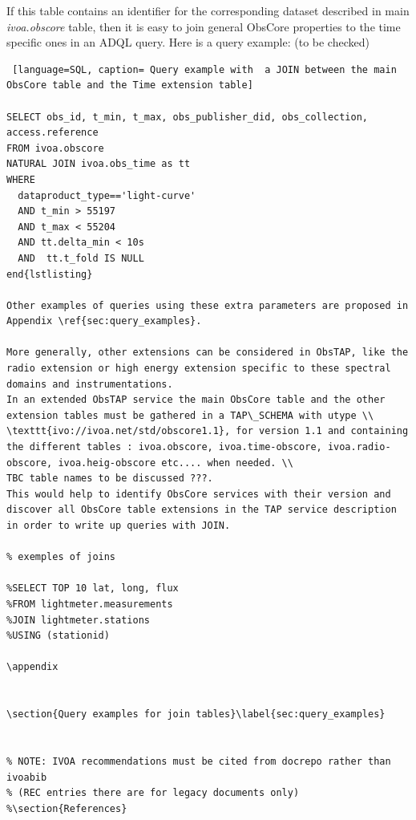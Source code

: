 \documentclass[11pt,a4paper]{ivoa}
\begin{document}
 If this table contains an identifier for the corresponding dataset described in main \emph{ivoa.obscore} table, then it is easy to join  general ObsCore properties to the time specific ones in an ADQL query.
 Here is a query  example:  (to be checked)
 \begin{lstlisting} [language=SQL, caption= Query example with  a JOIN between the main ObsCore table and the Time extension table]

SELECT obs_id, t_min, t_max, obs_publisher_did, obs_collection, access.reference
FROM ivoa.obscore
NATURAL JOIN ivoa.obs_time as tt
WHERE
  dataproduct_type=='light-curve'
  AND t_min > 55197
  AND t_max < 55204
  AND tt.delta_min < 10s
  AND  tt.t_fold IS NULL
end{lstlisting}

Other examples of queries using these extra parameters are proposed in Appendix \ref{sec:query_examples}.

More generally, other extensions can be considered in ObsTAP, like the radio extension or high energy extension specific to these spectral domains and instrumentations.
In an extended ObsTAP service the main ObsCore table and the other extension tables must be gathered in a TAP\_SCHEMA with utype \\ \texttt{ivo://ivoa.net/std/obscore1.1}, for version 1.1 and containing the different tables : ivoa.obscore, ivoa.time-obscore, ivoa.radio-obscore, ivoa.heig-obscore etc.... when needed. \\
TBC table names to be discussed ???.
This would help to identify ObsCore services with their version and discover all ObsCore table extensions in the TAP service description in order to write up queries with JOIN.

% exemples of joins

%SELECT TOP 10 lat, long, flux
%FROM lightmeter.measurements
%JOIN lightmeter.stations
%USING (stationid)

\appendix


\section{Query examples for join tables}\label{sec:query_examples}


% NOTE: IVOA recommendations must be cited from docrepo rather than ivoabib
% (REC entries there are for legacy documents only)
%\section{References}


\end{lstlisting}
\end{document}
